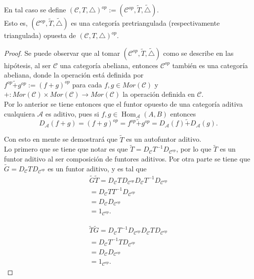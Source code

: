 \documentclass{article}
\begin{document}
\begin{enumerate}
En tal caso se define $(\mathscr{C},T,\triangle)^{op}:=(\mathscr{C}^{op},\tilde{T},\tilde{\triangle}).$\\
Esto es, $(\mathscr{C}^{op},\tilde{T},\tilde{\triangle})$ es una categoría pretriangulada (respectivamente triangulada) opuesta de
 $(\mathscr{C},T,\triangle)^{op}$.

\begin{proof}

Se puede observar que al tomar  $(\mathscr{C}^{op},\tilde{T},\tilde{\triangle})$ como se describe en las hipótesis, al ser $\mathscr{C}$ 
una categoría abeliana, entonces $\mathscr{C}^{op}$ también es una categoría abeliana, donde la operación está definida por \\
$f^{op}\tilde{+}g^{op}:=(f+g)^{op}$ para cada $f,g\in Mor(\mathscr{C})$ y\\
 $+: Mor(\mathscr{C})\times Mor(\mathscr{C})\rightarrow Mor(\mathscr{C})$ la operación definida en $ \mathscr{C}$.\\

Por lo anterior se tiene entonces que el funtor opuesto de una categoría aditiva cualquiera $\mathscr{A}$ es aditivo, pues si $f,g\in 
\operatorname{Hom}_{\mathscr{A}}(A,B)$ entonces 
\[D_{\mathscr{A}}(f+g)=(f+g)^{op}=f^{op}\tilde{+}g^{op}=D_{\mathscr{A}}(f)\tilde{+}D_{\mathscr{A}}(g).\]

Con esto en mente se demostrará que $\tilde{T}$ es un autofuntor aditivo.\\

Lo primero que se tiene que notar es que $\tilde{T}=D_{\mathscr{C}}T^{-1}D_{\mathscr{C}^{op}}$, por lo que $\tilde{T}$ es un funtor aditivo al ser 
composición de funtores aditivos. Por otra parte se tiene que $\tilde{G}=D_{\mathscr{C}}T^{}D_{\mathscr{C}^{op}}$ es un funtor aditivo, y es tal 
que 
\begin{gather*}
\tilde{G}\tilde{T}=D_{\mathscr{C}}T^{}D_{\mathscr{C}^{op}}D_{\mathscr{C}}T^{-1}D_{\mathscr{C}^{op}}\\
=D_{\mathscr{C}}TT^{-1}D_{\mathscr{C}^{op}}\\
=D_{\mathscr{C}}D_{\mathscr{C}^{op}}\\
=1_{\mathscr{C}^{op}}.
\end{gather*}

\begin{gather*}
\tilde{T}\tilde{G}=D_{\mathscr{C}}T^{-1}D_{\mathscr{C}^{op}}D_{\mathscr{C}}T^{}D_{\mathscr{C}^{op}}\\
=D_{\mathscr{C}}T^{-1}TD_{\mathscr{C}^{op}}\\
=D_{\mathscr{C}}D_{\mathscr{C}^{op}}\\
=1_{\mathscr{C}^{op}}.
\end{gather*}


\end{proof}
\end{enumerate}
\end{document}
